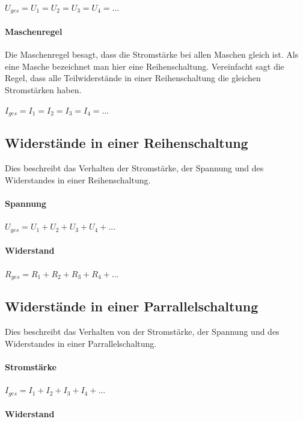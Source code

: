 \documentclass[a4paper,10pt,ngerman]{scrartcl}
\begin{document}
$U_{ges} = U_1 = U_2 = U_3 = U_4 = ...$

\paragraph{Maschenregel}

Die Maschenregel besagt, dass die Stromstärke bei allen Maschen gleich ist. Als eine Masche bezeichnet man hier eine Reihenschaltung. Vereinfacht sagt die Regel, dass alle Teilwiderstände in einer Reihenschaltung die gleichen Stromstärken haben.

$I_{ges} = I_1 = I_2 = I_3 = I_4 =...$

\subsection{Widerstände in einer Reihenschaltung}

Dies beschreibt das Verhalten der Stromstärke, der Spannung und des Widerstandes in einer Reihenschaltung.

\paragraph{Spannung}

$U_{ges} = U_1 + U_2 + U_3 + U_4 +...$

\paragraph{Widerstand}

$R_{ges} = R_1 + R_2 + R_3 + R_4 +...$

\subsection{Widerstände in einer Parrallelschaltung}

Dies beschreibt das Verhalten von der Stromstärke, der Spannung und des Widerstandes in einer Parrallelschaltung.

\paragraph{Stromstärke}

$I_{ges} = I_1 + I_2 + I_3 + I_4 +...$

\paragraph{Widerstand}
\end{document}
